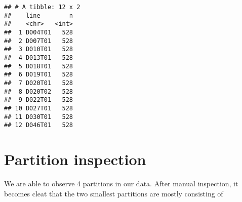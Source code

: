 \documentclass[
]{article}
\newenvironment{Shaded}{\begin{snugshade}}{\end{snugshade}}
\newcommand{\DataTypeTok}[1]{\textcolor[rgb]{0.13,0.29,0.53}{#1}}
\newcommand{\FloatTok}[1]{\textcolor[rgb]{0.00,0.00,0.81}{#1}}
\newcommand{\KeywordTok}[1]{\textcolor[rgb]{0.13,0.29,0.53}{\textbf{#1}}}
\newcommand{\NormalTok}[1]{#1}
\newcommand{\OperatorTok}[1]{\textcolor[rgb]{0.81,0.36,0.00}{\textbf{#1}}}
\newcommand{\StringTok}[1]{\textcolor[rgb]{0.31,0.60,0.02}{#1}}
\begin{document}
\begin{Shaded}
\end{Shaded}

\begin{verbatim}
## # A tibble: 12 x 2
##    line        n
##    <chr>   <int>
##  1 D004T01   528
##  2 D007T01   528
##  3 D010T01   528
##  4 D013T01   528
##  5 D018T01   528
##  6 D019T01   528
##  7 D020T01   528
##  8 D020T02   528
##  9 D022T01   528
## 10 D027T01   528
## 11 D030T01   528
## 12 D046T01   528
\end{verbatim}

\hypertarget{partition-inspection}{%
\section{Partition inspection}\label{partition-inspection}}

We are able to observe 4 partitions in our data. After manual
inspection, it becomes cleat that the two smallest partitions are mostly
consisting of

\begin{Shaded}
\end{Shaded}
\end{document}
